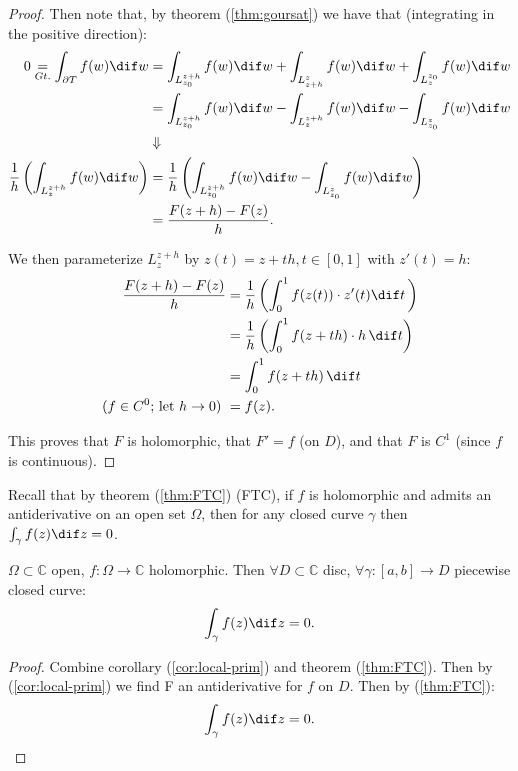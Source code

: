 \begin{proof}
Then note that, by theorem (\ref{thm:goursat}) we have that (integrating in the positive direction):
\begin{align*}
   0 \underset{Gt.}{=}\int_{\partial T} f(w)  \dif w &= \int_{L_{z_0}^{z+h}} f(w)  \dif w + \int_{L_{z+h}^{z}} f(w)  \dif w + \int_{L_{z}^{z_0}} f(w)  \dif w\\
   &= \int_{L_{z_0}^{z+h}} f(w)  \dif w - \int_{L_{z}^{z+h}} f(w)  \dif w - \int_{L_{z_0}^{z}} f(w)  \dif w\\
   &\Downarrow\\
   \frac{1}{h}\left( \int_{L_{z}^{z+h}} f(w)  \dif w \right) &=   \frac{1}{h}\left( \int_{L_{z_0}^{z+h}} f(w)  \dif w - \int_{L_{z_0}^{z}} f(w)  \dif w \right)\\
   &= \frac{F(z+h)-F(z)}{h}.
\end{align*}

We then parameterize $L_{z}^{z+h}$ by $z(t) = z+t h, t\in[0,1]$ with $z'(t) = h$:
\begin{align*}
    \frac{F(z+h)-F(z)}{h} &=  \frac{1}{h}\left( \int_0^1 f(z(t)) \cdot z'(t)  \dif t \, \right)\\
    &=\frac{1}{h}\left( \int_0^1 f(z+th) \cdot h \,  \dif t \right)\\
    &= \int_0^1 f(z+th) \,  \dif t\\
    \text{($f \in C^0$; let $h\rightarrow 0$) } &= f(z).
\end{align*}

This proves that $F$ is holomorphic, that $F' = f$ (on $D$), and that $F$ is $C^1$ (since $f$ is continuous).

\end{proof}

Recall that by theorem (\ref{thm:FTC}) (FTC), if $f$ is holomorphic and admits an antiderivative on an open set $\Omega$, then for any closed curve $\gamma$ then $\int_\gamma f(z) \dif z = 0$.

\begin{corollary}
$\Omega \subset \mathbb{C}$ open, $f:\Omega \rightarrow \mathbb{C}$ holomorphic. Then $\forall D \subset \mathbb{C}$ disc, $\forall \gamma:[a,b] \rightarrow D$ piecewise closed curve:
\begin{align*}
    \int_\gamma f(z) \dif z = 0.
\end{align*}

\end{corollary}

\begin{proof}
Combine corollary (\ref{cor:local-prim}) and theorem (\ref{thm:FTC}). Then by (\ref{cor:local-prim}) we find F an antiderivative for $f$ on $D$. Then by (\ref{thm:FTC}):
\begin{align*}
    \int_\gamma f(z) \dif z = 0.
\end{align*}
\end{proof}

